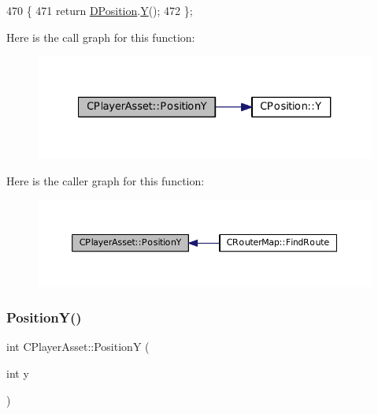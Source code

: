 \begin{DoxyCode}
470                              \{
471             \textcolor{keywordflow}{return} \hyperlink{classCPlayerAsset_aa9f53c009b181c7c5647c6b03776a04c}{DPosition}.\hyperlink{classCPosition_a1aa8a30e2f08dda1f797736ba8c13a87}{Y}();  
472         \};
\end{DoxyCode}
Here is the call graph for this function\+:
\nopagebreak
\begin{figure}[H]
\begin{center}
\leavevmode
\includegraphics[width=327pt]{classCPlayerAsset_a4f70846298e9951489ef138847c268a5_cgraph}
\end{center}
\end{figure}
Here is the caller graph for this function\+:
\nopagebreak
\begin{figure}[H]
\begin{center}
\leavevmode
\includegraphics[width=350pt]{classCPlayerAsset_a4f70846298e9951489ef138847c268a5_icgraph}
\end{center}
\end{figure}
\hypertarget{classCPlayerAsset_a497fe719ca97252f0ee7985e0e30518e}{}\label{classCPlayerAsset_a497fe719ca97252f0ee7985e0e30518e} 
\subsubsection{\texorpdfstring{Position\+Y()}{PositionY()}\hspace{0.1cm}{\footnotesize\ttfamily [2/2]}}
{\footnotesize\ttfamily int C\+Player\+Asset\+::\+PositionY (\begin{DoxyParamCaption}\item[{int}]{y }\end{DoxyParamCaption})}



